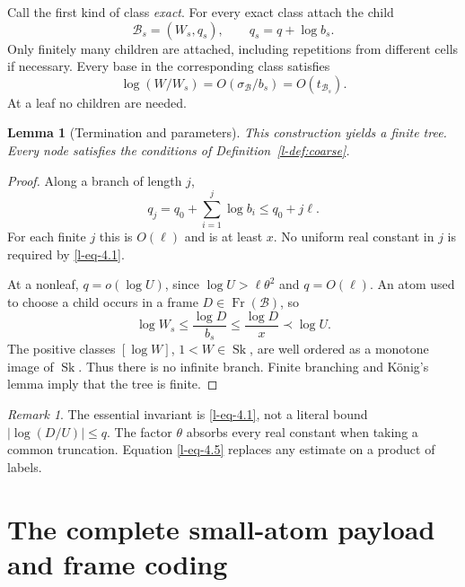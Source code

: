 \documentclass[11pt]{article}
\newtheorem{lemma}[theorem]{Lemma}
\theoremstyle{definition}
\theoremstyle{remark}
\newtheorem{remark}[theorem]{Remark}
\newcommand{\Sk}{\operatorname{Sk}}
\newcommand{\Fr}{\operatorname{Fr}}
\newcommand{\calB}{\mathcal B}
\numberwithin{equation}{section}
\begin{document}
Call the first kind of class \emph{exact}.
For every exact class attach the child
\begin{equation}
 \calB_s=(W_s,q_s),\qquad q_s=q+\log b_s.
 \label{l-eq-4.3}
\end{equation}
Only finitely many children are attached, including repetitions
from different cells if necessary.  Every base in the corresponding
class satisfies
\begin{equation}
 \log(W/W_s)=O(\sigma_{\calB}/b_s)
                  =O(t_{\calB_s}).
 \label{l-eq-4.4}
\end{equation}
At a leaf no children are needed.

\begin{lemma}[Termination and parameters]\label{l-lem:tree}
This construction yields a finite tree.  Every node satisfies the
conditions of Definition~\ref{l-def:coarse}.
\end{lemma}
\begin{proof}
Along a branch of length $j$,
\begin{equation}
 q_j=q_0+\sum_{i=1}^j\log b_i\le q_0+j\ell.
 \label{l-eq-4.5}
\end{equation}
For each finite $j$ this is $O(\ell)$ and is at least $x$.
No uniform real constant in $j$ is required by \eqref{l-eq-4.1}.

At a nonleaf, $q=o(\log U)$, since
$\log U>\ell\theta^2$ and $q=O(\ell)$.
An atom used to choose a child occurs in a frame $D\in\Fr(\calB)$,
so
\begin{equation}
 \log W_s\le\frac{\log D}{b_s}
       \le\frac{\log D}{x}\prec\log U .
 \label{l-eq-4.6}
\end{equation}
The positive classes $[\log W]$, $1<W\in\Sk$, are well ordered
as a monotone image of $\Sk$.  Thus there is no infinite branch.
Finite branching and K\"onig's lemma imply that the tree is finite.
\end{proof}

\begin{remark}
The essential invariant is \eqref{l-eq-4.1}, not a literal bound
$|\log(D/U)|\le q$.  The factor $\theta$ absorbs every real
constant when taking a common truncation.
Equation \eqref{l-eq-4.5} replaces any estimate on a product of labels.
\end{remark}

\section{The complete small-atom payload and frame coding}
\end{document}
